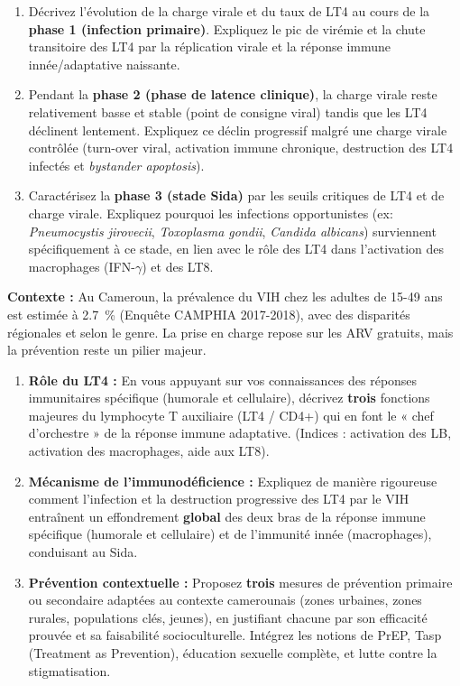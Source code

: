 \documentclass[11pt]{article}
\begin{document}
\begin{exercice}
\begin{enumerate}
    \item Décrivez l'évolution de la charge virale et du taux de LT4 au cours de la \textbf{phase 1 (infection primaire)}. Expliquez le pic de virémie et la chute transitoire des LT4 par la réplication virale et la réponse immune innée/adaptative naissante.
    \item Pendant la \textbf{phase 2 (phase de latence clinique)}, la charge virale reste relativement basse et stable (point de consigne viral) tandis que les LT4 déclinent lentement. Expliquez ce déclin progressif malgré une charge virale contrôlée (turn-over viral, activation immune chronique, destruction des LT4 infectés et \emph{bystander apoptosis}).
    \item Caractérisez la \textbf{phase 3 (stade Sida)} par les seuils critiques de LT4 et de charge virale. Expliquez pourquoi les infections opportunistes (ex: \emph{Pneumocystis jirovecii}, \emph{Toxoplasma gondii}, \emph{Candida albicans}) surviennent spécifiquement à ce stade, en lien avec le rôle des LT4 dans l'activation des macrophages (IFN-$\gamma$) et des LT8.
\end{enumerate}
\end{exercice}

\begin{exercice}
\textbf{Contexte :} Au Cameroun, la prévalence du VIH chez les adultes de 15-49 ans est estimée à \SI{2,7}{\%} (Enquête CAMPHIA 2017-2018), avec des disparités régionales et selon le genre. La prise en charge repose sur les ARV gratuits, mais la prévention reste un pilier majeur.
\begin{enumerate}
    \item \textbf{Rôle du LT4 :} En vous appuyant sur vos connaissances des réponses immunitaires spécifique (humorale et cellulaire), décrivez \textbf{trois} fonctions majeures du lymphocyte T auxiliaire (LT4 / CD4+) qui en font le « chef d'orchestre » de la réponse immune adaptative. (Indices : activation des LB, activation des macrophages, aide aux LT8).
    \item \textbf{Mécanisme de l'immunodéficience :} Expliquez de manière rigoureuse comment l'infection et la destruction progressive des LT4 par le VIH entraînent un effondrement \textbf{global} des deux bras de la réponse immune spécifique (humorale et cellulaire) et de l'immunité innée (macrophages), conduisant au Sida.
    \item \textbf{Prévention contextuelle :} Proposez \textbf{trois} mesures de prévention primaire ou secondaire adaptées au contexte camerounais (zones urbaines, zones rurales, populations clés, jeunes), en justifiant chacune par son efficacité prouvée et sa faisabilité socioculturelle. Intégrez les notions de PrEP, Tasp (Treatment as Prevention), éducation sexuelle complète, et lutte contre la stigmatisation.
\end{enumerate}
\end{exercice}
\end{document}
